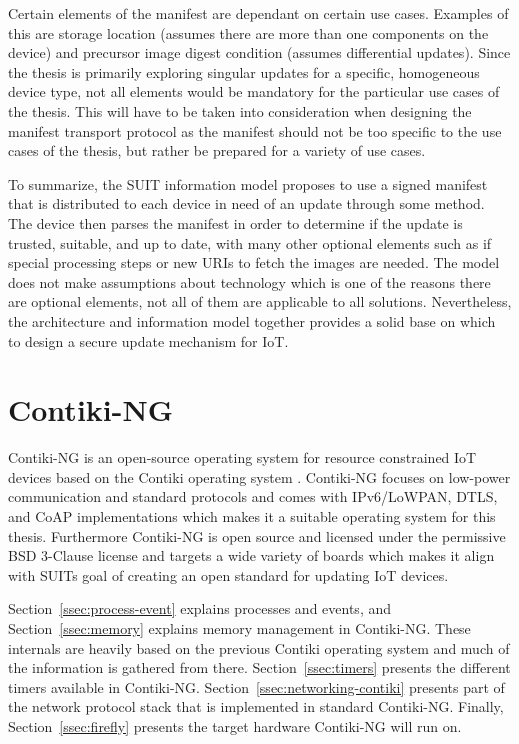 \documentclass[0-thesis.tex]{subfiles}
\begin{document}

Certain elements of the manifest are dependant on certain use cases. Examples of this are
storage location (assumes there are more than one components on the device) and precursor
image digest condition (assumes differential updates). Since the thesis is primarily
exploring singular updates for a specific, homogeneous device type, not all elements would
be mandatory for the particular use cases of the thesis. This will have to be taken into
consideration when designing the manifest transport protocol as the manifest should not be
too specific to the use cases of the thesis, but rather be prepared for a variety of use
cases.

To summarize, the SUIT information model proposes to use a signed manifest that is
distributed to each device in need of an update through some method. The device then
parses the manifest in order to determine if the update is trusted, suitable, and up to
date, with many other optional elements such as if special processing steps or new URIs to
fetch the images are needed. The model does not make assumptions about technology which is
one of the reasons there are optional elements, not all of them are applicable to all
solutions. Nevertheless, the architecture and information model together provides a solid
base on which to design a secure update mechanism for IoT.

\section{Contiki-NG}
\label{sec:contiki-ng}
Contiki-NG is an open-source operating system for resource constrained IoT devices based
on the Contiki operating system \parencite{contiki-ng-github, contiki-github}.
Contiki-NG focuses on low-power communication and standard protocols and comes with
IPv6/LoWPAN, DTLS, and CoAP implementations which makes it a suitable operating system for
this thesis. Furthermore Contiki-NG is open source and licensed under the permissive BSD
3-Clause license and targets a wide variety of boards which makes it align with SUITs goal
of creating an open standard for updating IoT devices.

Section~\ref{ssec:process-event} explains processes and events, and
Section~\ref{ssec:memory} explains memory management in Contiki-NG. These internals are
heavily based on the previous Contiki operating system and much of the information is
gathered from there. Section~\ref{ssec:timers} presents the different timers available in
Contiki-NG. Section~\ref{ssec:networking-contiki} presents part of the network protocol
stack that is implemented in standard Contiki-NG. Finally, Section~\ref{ssec:firefly}
presents the target hardware Contiki-NG will run on.
\end{document}
